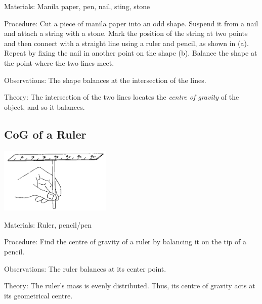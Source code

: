 \begin{multicols}{2}
\begin{description*}
\item[Materials:]{Manila paper, pen, nail, sting, stone}
\item[Procedure:]{Cut a piece of manila paper into an odd shape. Suspend it from a nail and attach a string with a stone. Mark the position of the string at two points and then connect with a straight line using a ruler and pencil, as shown in (a). Repeat by fixing the nail in another point on the shape (b). Balance the shape at the point where the two lines meet.}
\item[Observations:]{The shape balances at the intersection of the lines.}
\item[Theory:]{The intersection of the two lines locates the \emph{centre of gravity} of the object, and so it balances.}
\end{description*}

\subsection{CoG of a Ruler}

\begin{center}
\includegraphics[width=0.4\textwidth]{./img/source/cog-ruler.png}
\end{center}

\begin{description*}
\item[Materials:]{Ruler, pencil/pen}
\item[Procedure:]{Find the centre of gravity of a ruler by balancing it on the tip of a pencil.}
\item[Observations:]{The ruler balances at its center point.}
\item[Theory:]{The ruler's mass is evenly distributed. Thus, its centre of gravity acts at its geometrical centre.}
\end{description*}


\end{multicols}
